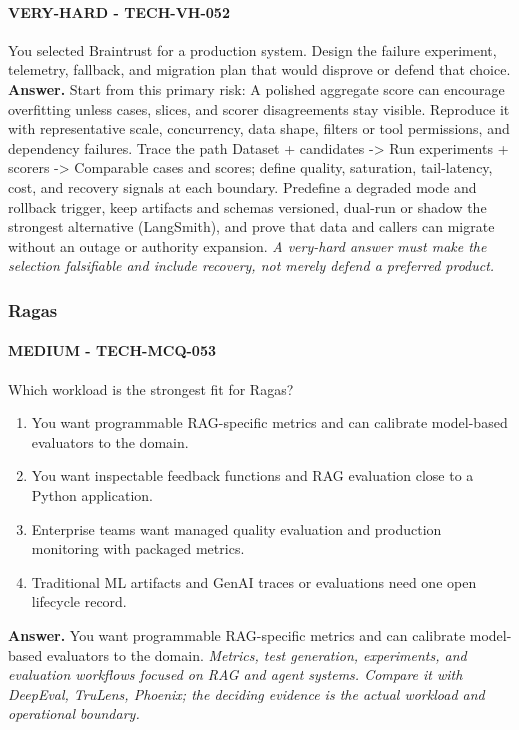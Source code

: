 \paragraph{VERY-HARD - TECH-VH-052} You selected Braintrust for a production system. Design the failure experiment, telemetry, fallback, and migration plan that would disprove or defend that choice.
\textbf{Answer.} Start from this primary risk: A polished aggregate score can encourage overfitting unless cases, slices, and scorer disagreements stay visible. Reproduce it with representative scale, concurrency, data shape, filters or tool permissions, and dependency failures. Trace the path Dataset + candidates -> Run experiments + scorers -> Comparable cases and scores; define quality, saturation, tail-latency, cost, and recovery signals at each boundary. Predefine a degraded mode and rollback trigger, keep artifacts and schemas versioned, dual-run or shadow the strongest alternative (LangSmith), and prove that data and callers can migrate without an outage or authority expansion.
\textit{A very-hard answer must make the selection falsifiable and include recovery, not merely defend a preferred product.}
\subsubsection*{Ragas}
\paragraph{MEDIUM - TECH-MCQ-053} Which workload is the strongest fit for Ragas?
\begin{enumerate}[label=\Alph*.]
\item You want programmable RAG-specific metrics and can calibrate model-based evaluators to the domain.
\item You want inspectable feedback functions and RAG evaluation close to a Python application.
\item Enterprise teams want managed quality evaluation and production monitoring with packaged metrics.
\item Traditional ML artifacts and GenAI traces or evaluations need one open lifecycle record.
\end{enumerate}
\textbf{Answer.} You want programmable RAG-specific metrics and can calibrate model-based evaluators to the domain.
\textit{Metrics, test generation, experiments, and evaluation workflows focused on RAG and agent systems. Compare it with DeepEval, TruLens, Phoenix; the deciding evidence is the actual workload and operational boundary.}
